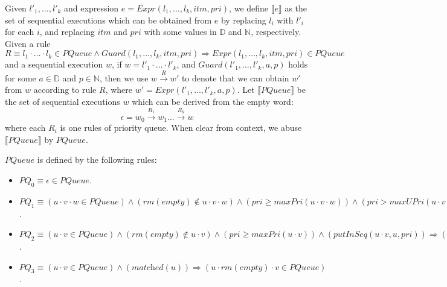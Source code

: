 Given $l'_1,\ldots,l'_k$ and expression $e=\textit{Expr}(l_1,\ldots,l_k,\textit{itm},\textit{pri})$, we define $\llbracket e \rrbracket$ as the set of sequential executions which can be obtained from $e$ by replacing $l_i$ with $l'_i$ for each $i$, and replacing $\textit{itm}$ and $\textit{pri}$ with some values in $\mathbb{D}$ and $\mathbb{N}$, respectively. Given a rule $R \equiv l_1 \cdot \ldots \cdot l_k \in \textit{PQueue} \wedge \textit{Guard}(l_1,\ldots,l_k,\textit{itm},\textit{pri}) \Rightarrow \textit{Expr}(l_1,\ldots,l_k,\textit{itm},\textit{pri}) \in \textit{PQueue}$ and a sequential execution $w$, if $w=l'_1 \cdot \ldots \cdot l'_k$, and $\textit{Guard}(l'_1,\ldots,l'_k,a,p)$ holds for some $a \in \mathbb{D}$ and $p \in \mathbb{N}$, then we use $w \xrightarrow{R} w'$ to denote that we can obtain $w'$ from $w$ according to rule $R$, where $w' = \textit{Expr}(l'_1,\ldots,l'_k,a,p)$. Let $\llbracket \textit{PQueue} \rrbracket$ be the set of sequential executions $w$ which can be derived from the empty word: $$\epsilon = w_0 \xrightarrow{R_1} w_1 \ldots \xrightarrow{R_k} w$$ where each $R_i$ is one rules of priority queue. When clear from context, we abuse $\llbracket \textit{PQueue} \rrbracket$ by $\textit{PQueue}$.

\begin{definition}\label{def:inductive rules of priority queue}
$\textit{PQueue}$ is defined by the following rules:
\begin{itemize}
\setlength{\itemsep}{0.5pt}
\item[-] $\textit{PQ}_0 \equiv \epsilon \in \textit{PQueue}$.

\item[-] $\textit{PQ}_1 \equiv (u \cdot v \cdot w \in \textit{PQueue}) \wedge (\textit{rm}(\textit{empty}) \notin u \cdot v \cdot w) \wedge (\textit{pri} \geq \textit{maxPri}(u \cdot v \cdot w)) \wedge (\textit{pri} > \textit{maxUPri}(u \cdot v \cdot w)) \wedge (\textit{matched}(u \cdot v) ) \wedge (\textit{putInSeq}(u \cdot v \cdot w,u,\textit{pri})) \Rightarrow (u \cdot \textit{put}(\textit{itm},\textit{pri}) \cdot v \cdot \textit{rm}(\textit{itm}) \cdot w \in \textit{PQueue})$.

\item[-] $\textit{PQ}_2 \equiv (u \cdot v \in \textit{PQueue}) \wedge (\textit{rm}(\textit{empty}) \notin u \cdot v) \wedge (\textit{pri} \geq \textit{maxPri}(u \cdot v)) \wedge (\textit{putInSeq}(u \cdot v,u,\textit{pri})) \Rightarrow (u \cdot \textit{put}(\textit{itm},\textit{pri}) \cdot v \in \textit{PQueue})$.

\item[-] $\textit{PQ}_3 \equiv (u \cdot v \in \textit{PQueue}) \wedge (\textit{matched}(u) ) \Rightarrow (u \cdot \textit{rm}(\textit{empty}) \cdot v \in \textit{PQueue})$.
\end{itemize}
\end{definition}

